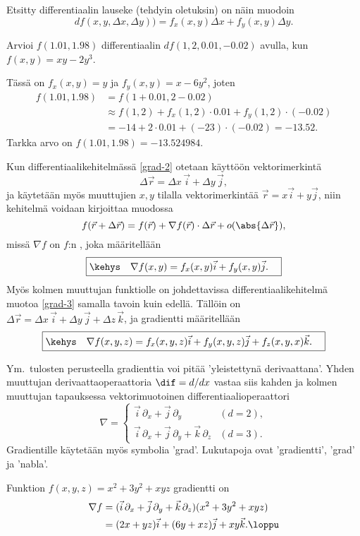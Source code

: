 Etsitty differentiaalin lauseke (tehdyin oletuksin) on näin muodoin
\[ 
df(x,y,\Delta x,\Delta y)) = f_x(x,y)\Delta x + f_y(x,y)\Delta y.  
\]
\begin{Exa} \label{grad-ex1} Arvioi $f(1.01,1.98)$ differentiaalin
$df(1,2,0.01,-0.02)$ avulla, kun $f(x,y)=xy-2y^3$.
\end{Exa}
\ratk Tässä on $f_x(x,y) = y$ ja $f_y(x,y)=x-6y^2$, joten
\begin{align*}
f(1.01,1.98) &= f(1+0.01,2-0.02) \\
             &\approx f(1,2) + f_x(1,2)\cdot 0.01 + f_y(1,2)\cdot(-0.02) \\
             &= -14 + 2\cdot 0.01 + (-23)\cdot (-0.02) = -13.52.
\end{align*}
Tarkka arvo on $f(1.01,1.98)=-13.524984$. \loppu

Kun differentiaalikehitelmässä \eqref{grad-2} otetaan käyttöön vektorimerkintä
\[ 
\Delta \vec r = \Delta x\,\vec i + \Delta y\,\vec j, 
\]
ja käytetään myös muuttujien $x,y$ tilalla vektorimerkintää $\vec r = x\vec i + y\vec j$, niin
kehitelmä voidaan kirjoittaa muodossa
\begin{equation} \label{grad-3}
f(\vec r + \Delta \vec r) 
         = f(\vec r) + \nabla f(\vec r)\cdot\Delta\vec r + o(\abs{\Delta\vec r}),
\end{equation}
missä $\nabla f$ on $f$:n , joka määritellään
\[
\boxed{\kehys\quad \nabla f(x,y)=f_x(x,y)\vec i+f_y(x,y)\vec j. \quad}
\]
Myös kolmen muuttujan funktiolle on johdettavissa differentiaalikehitelmä muotoa \eqref{grad-3}
samalla tavoin kuin edellä. Tällöin on 
$\Delta\vec r = \Delta x\,\vec i + \Delta y\,\vec j + \Delta z\,\vec k$, ja gradientti 
määritellään
\[
\boxed{\kehys\quad \nabla f(x,y,z)=f_x(x,y,z)\vec i+f_y(x,y,z)\vec j+f_z(x,y,x)\vec k. \quad}
\]

Ym.\ tulosten perusteella gradienttia voi pitää 'yleistettynä derivaattana'. Yhden muuttujan
derivaattaoperaattoria $\dif=d/dx$ vastaa siis kahden ja kolmen muuttujan tapauksessa 
vektorimuotoinen differentiaalioperaattori
\[
\nabla=\begin{cases}
\vec i\,\partial_x+\vec j\,\partial_y &(d=2), \\
\vec i\,\partial_x+\vec j\,\partial_y+\vec k\,\partial_z &(d=3).
\end{cases}
\]
Gradientille käytetään myös symbolia 'grad'. Lukutapoja ovat 'gradientti', 'grad' ja 'nabla'.
\begin{Exa} Funktion $f(x,y,z)=x^2+3y^2+xyz$ gradientti on
\begin{align*}
\nabla f &= (\vec i\,\partial_x + \vec j\,\partial_y + \vec k\,\partial_z)(x^2+3y^2+xyz) \\
         &= (2x+yz)\vec i +(6y+xz)\vec j+xy\vec k. \loppu
\end{align*}
\end{Exa}

